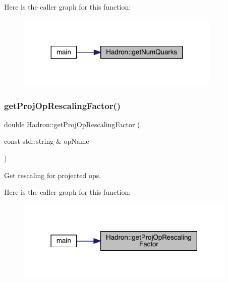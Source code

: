 Here is the caller graph for this function\+:\nopagebreak
\begin{figure}[H]
\begin{center}
\leavevmode
\includegraphics[width=275pt]{d1/daf/namespaceHadron_a030f1f2fabdb2b0de5421b2a0a15689c_icgraph}
\end{center}
\end{figure}
\mbox{\label{namespaceHadron_aeb564a291631b101c405d7f4257391f8}} 
\subsubsection{\texorpdfstring{getProjOpRescalingFactor()}{getProjOpRescalingFactor()}}
{\footnotesize\ttfamily double Hadron\+::get\+Proj\+Op\+Rescaling\+Factor (\begin{DoxyParamCaption}\item[{const std\+::string \&}]{op\+Name }\end{DoxyParamCaption})}



Get rescaling for projected ops. 

Here is the caller graph for this function\+:\nopagebreak
\begin{figure}[H]
\begin{center}
\leavevmode
\includegraphics[width=297pt]{d1/daf/namespaceHadron_aeb564a291631b101c405d7f4257391f8_icgraph}
\end{center}
\end{figure}
\mbox{\label{namespaceHadron_abc76a2d893a589ba2a1a346954901854}} 
